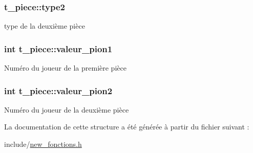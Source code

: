 \subsubsection[{\texorpdfstring{type2}{type2}}]{ t\+\_\+piece\+::type2}\hypertarget{structt__piece_ad48b124427fe8c945cee48b15f2a270b}{}\label{structt__piece_ad48b124427fe8c945cee48b15f2a270b}
type de la deuxième pièce 
\subsubsection[{\texorpdfstring{valeur\+\_\+pion1}{valeur_pion1}}]{\setlength{\rightskip}{0pt plus 5cm}int t\+\_\+piece\+::valeur\+\_\+pion1}\hypertarget{structt__piece_a2854e60853e81ec5cb32a0b4d42a2c8f}{}\label{structt__piece_a2854e60853e81ec5cb32a0b4d42a2c8f}
Numéro du joueur de la première pièce 
\subsubsection[{\texorpdfstring{valeur\+\_\+pion2}{valeur_pion2}}]{\setlength{\rightskip}{0pt plus 5cm}int t\+\_\+piece\+::valeur\+\_\+pion2}\hypertarget{structt__piece_a072647ef6ac729981f55d043655f928f}{}\label{structt__piece_a072647ef6ac729981f55d043655f928f}
Numéro du joueur de la deuxième pièce 

La documentation de cette structure a été générée à partir du fichier suivant \+:\begin{DoxyCompactItemize}
\item 
include/\hyperlink{new__fonctions_8h}{new\+\_\+fonctions.\+h}\end{DoxyCompactItemize}
